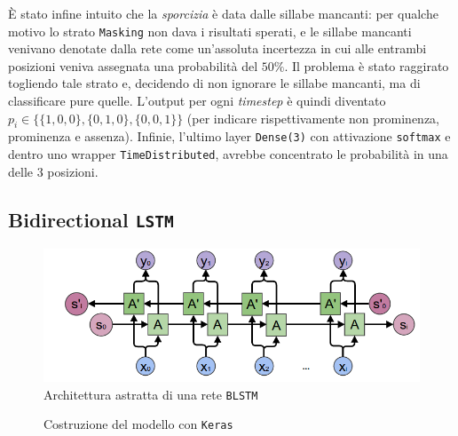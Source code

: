 \documentclass[twoside,twocolumn,10pt]{extarticle}
\theoremstyle{definition}
\begin{document}
		È stato infine intuito che la \textit{sporcizia} è data dalle sillabe mancanti: per qualche motivo lo strato \texttt{Masking} non dava i risultati sperati, e le sillabe mancanti venivano denotate dalla rete come un'assoluta incertezza in cui alle entrambi posizioni veniva assegnata una probabilità del $50\%$.  Il problema è stato raggirato togliendo tale strato e, decidendo di non ignorare le sillabe mancanti, ma di classificare pure quelle. L'output per ogni \textit{timestep} è quindi diventato $p_i \in \{\{1, 0, 0\}, \{0, 1, 0\}, \{0, 0, 1\}\}$ (per indicare rispettivamente non prominenza, prominenza e assenza). Infinie, l'ultimo layer \texttt{Dense(3)} con attivazione \texttt{softmax} e dentro uno wrapper \texttt{TimeDistributed}, avrebbe concentrato le probabilità in una delle $3$ posizioni.
		
	\subsection{Bidirectional \texttt{LSTM}}
		\begin{figure}
			\centering
			\includegraphics[scale=.26]{img/blstm.png}
			\caption{Architettura astratta di una rete \texttt{BLSTM}}
			\label{fig:blstm}
		\end{figure}
		\begin{figure}[ht!]
			\centering
			\caption{Costruzione del modello con \texttt{Keras}}
			
			\label{fig:modelcode}
		\end{figure}
\end{document}
